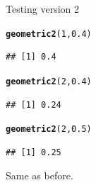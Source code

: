 \documentclass[unknownkeysallowed]{beamer}\usepackage[]{graphicx}\usepackage[]{color}
\makeatletter
\newcommand{\hlnum}[1]{\textcolor[rgb]{0.686,0.059,0.569}{#1}}%
\newcommand{\hlstd}[1]{\textcolor[rgb]{0.345,0.345,0.345}{#1}}%
\newcommand{\hlkwd}[1]{\textcolor[rgb]{0.737,0.353,0.396}{\textbf{#1}}}%
\newenvironment{kframe}{%
 \def\at@end@of@kframe{}%
 \ifinner\ifhmode%
  \def\at@end@of@kframe{\end{minipage}}%
  \begin{minipage}{\columnwidth}%
 \fi\fi%
 \def\FrameCommand##1{\hskip\@totalleftmargin \hskip-\fboxsep
 \colorbox{shadecolor}{##1}\hskip-\fboxsep
     \hskip-\linewidth \hskip-\@totalleftmargin \hskip\columnwidth}%
 \MakeFramed {\advance\hsize-\width
   \@totalleftmargin\z@ \linewidth\hsize
   \@setminipage}}%
 {\par\unskip\endMakeFramed%
 \at@end@of@kframe}
\newenvironment{knitrout}{}{} %
\makeatother
\begin{document}
\begin{frame}[fragile]{Testing version 2}
  
\begin{knitrout}
\color{fgcolor}\begin{kframe}
\begin{alltt}
\hlkwd{geometric2}\hlstd{(}\hlnum{1}\hlstd{,}\hlnum{0.4}\hlstd{)}
\end{alltt}
\begin{verbatim}
## [1] 0.4
\end{verbatim}
\begin{alltt}
\hlkwd{geometric2}\hlstd{(}\hlnum{2}\hlstd{,}\hlnum{0.4}\hlstd{)}
\end{alltt}
\begin{verbatim}
## [1] 0.24
\end{verbatim}
\begin{alltt}
\hlkwd{geometric2}\hlstd{(}\hlnum{2}\hlstd{,}\hlnum{0.5}\hlstd{)}
\end{alltt}
\begin{verbatim}
## [1] 0.25
\end{verbatim}
\end{kframe}
\end{knitrout}

Same as before.
  
\end{frame}
\end{document}
